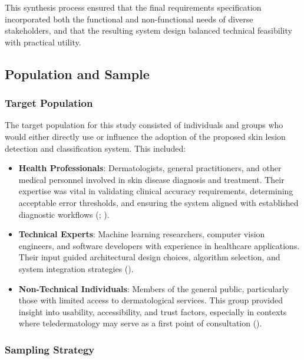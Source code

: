 \documentclass[
  12pt,
  oneside]{article}
\providecommand{\tightlist}{%
  \setlength{\itemsep}{0pt}\setlength{\parskip}{0pt}}
\begin{document}
This synthesis process ensured that the final requirements specification
incorporated both the functional and non-functional needs of diverse
stakeholders, and that the resulting system design balanced technical
feasibility with practical utility.

\subsection{Population and Sample}\label{population-and-sample}

\subsubsection{Target Population}\label{target-population}

The target population for this study consisted of individuals and groups
who would either directly use or influence the adoption of the proposed
skin lesion detection and classification system. This included:

\begin{itemize}
\tightlist
\item
  \textbf{Health Professionals}: Dermatologists, general practitioners,
  and other medical personnel involved in skin disease diagnosis and
  treatment. Their expertise was vital in validating clinical accuracy
  requirements, determining acceptable error thresholds, and ensuring
  the system aligned with established diagnostic workflows
  (;
  ).\\
\item
  \textbf{Technical Experts}: Machine learning researchers, computer
  vision engineers, and software developers with experience in
  healthcare applications. Their input guided architectural design
  choices, algorithm selection, and system integration strategies
  ().\\
\item
  \textbf{Non-Technical Individuals}: Members of the general public,
  particularly those with limited access to dermatological services.
  This group provided insight into usability, accessibility, and trust
  factors, especially in contexts where teledermatology may serve as a
  first point of consultation ().
\end{itemize}

\subsubsection{Sampling Strategy}\label{sampling-strategy}
\end{document}
